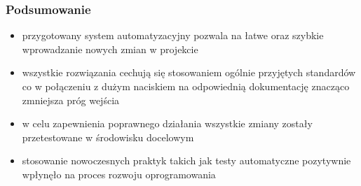 \documentclass[10pt]{beamer}
\begin{document}
\begin{frame}
\frametitle{Podsumowanie}
\begin{itemize}
    \item przygotowany system automatyzacyjny pozwala na łatwe oraz szybkie wprowadzanie nowych zmian w projekcie
    \item wszystkie rozwiązania cechują się stosowaniem ogólnie przyjętych standardów co w połączeniu z dużym naciskiem na odpowiednią dokumentację znacząco zmniejsza próg wejścia
    \item w celu zapewnienia poprawnego działania wszystkie zmiany zostały przetestowane w środowisku docelowym
    \item stosowanie nowoczesnych praktyk takich jak testy automatyczne pozytywnie wpłynęło na proces rozwoju oprogramowania
\end{itemize}
\end{frame}
\end{document}
